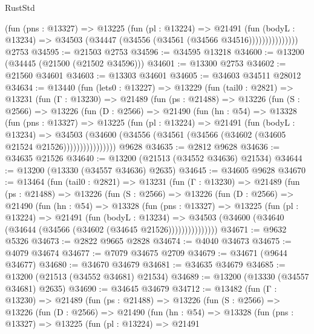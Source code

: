 \begin{lexlean}{RustStd}
\begin{coremodule}
                    (fun (pns : @13327) =>
                    @13225
                      (fun (pl : @13224) =>
                      @21491
                        (fun (bodyL : @13234) =>
                        @34503 (@34447 (@34556 (@34561 (@34566 @34516)))))))))))))))
    @2753
@34595 := @21503 @2753
@34596 := @34595 @13218
@34600 := @13200 (@34445 (@21500 (@21502 @34596)))
@34601 := @13300 @2753
@34602 := @21560 @34601
@34603 := @13303 @34601
@34605 := @34603 @34511 @28012
@34634 := @13440
    (fun (lets0 : @13227) =>
    @13229
      (fun (tail0 : @2821) =>
      @13231
        (fun (Γ : @13230) =>
        @21489
          (fun (ps : @21488) =>
          @13226
            (fun (S : @2566) =>
            @13226
              (fun (D : @2566) =>
              @21490
                (fun (hn : @54) =>
                @13328
                  (fun (pns : @13327) =>
                  @13225
                    (fun (pl : @13224) =>
                    @21491
                      (fun (bodyL : @13234) =>
                      @34503
                        (@34600
                          (@34556 (@34561 (@34566 (@34602 (@34605 @21524 @21526))))))))))))))))
    @9628
@34635 := @2812 @9628
@34636 := @34635 @21526
@34640 := @13200 (@21513 (@34552 @34636) @21534)
@34644 := @13200 (@13330 (@34557 @34636) @2635)
@34645 := @34605 @9628
@34670 := @13464
    (fun (tail0 : @2821) =>
    @13231
      (fun (Γ : @13230) =>
      @21489
        (fun (ps : @21488) =>
        @13226
          (fun (S : @2566) =>
          @13226
            (fun (D : @2566) =>
            @21490
              (fun (hn : @54) =>
              @13328
                (fun (pns : @13327) =>
                @13225
                  (fun (pl : @13224) =>
                  @21491
                    (fun (bodyL : @13234) =>
                    @34503 (@34600 (@34640 (@34644 (@34566 (@34602 (@34645 @21526)))))))))))))))
@34671 := @9632 @5326
@34673 := @2822 @9665 @2828
@34674 := @4040 @34673
@34675 := @4079 @34674
@34677 := @7079 @34675 @2709
@34679 := @34671 (@9644 @34677)
@34680 := @34670 @34679
@34681 := @34635 @34679
@34685 := @13200 (@21513 (@34552 @34681) @21534)
@34689 := @13200 (@13330 (@34557 @34681) @2635)
@34690 := @34645 @34679
@34712 := @13482
    (fun (Γ : @13230) =>
    @21489
      (fun (ps : @21488) =>
      @13226
        (fun (S : @2566) =>
        @13226
          (fun (D : @2566) =>
          @21490
            (fun (hn : @54) =>
            @13328
              (fun (pns : @13327) =>
              @13225
                (fun (pl : @13224) =>
                @21491

\end{coremodule}
\end{lexlean}

